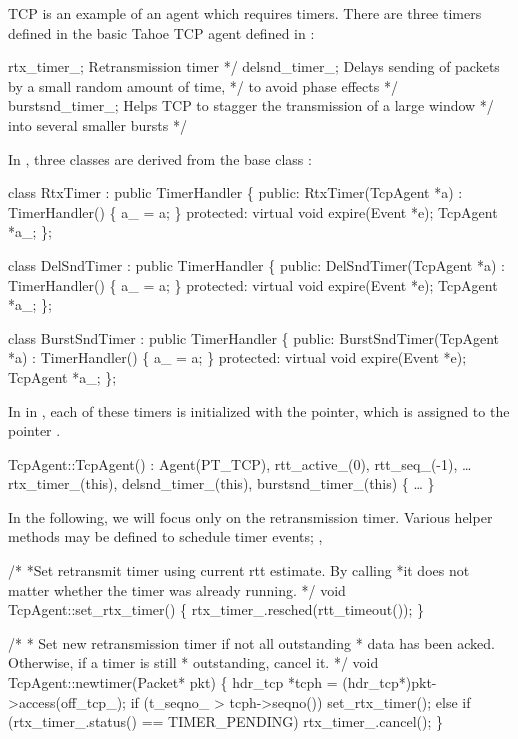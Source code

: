 TCP is an example of an agent which requires timers.  There are three timers
defined in the basic Tahoe TCP agent defined in :
\begin{program}
        rtx_timer_;      \*  Retransmission timer */
        delsnd_timer_;   \*  Delays sending of packets by a small random amount of time, */
			\* to avoid phase effects */
        burstsnd_timer_;   \* Helps TCP to stagger the transmission of a large window */
				\* into several smaller bursts */
\end{program}
In , three classes are derived from the base class
:
\begin{program}
        class RtxTimer : public TimerHandler \{
        public:
            RtxTimer(TcpAgent *a) : TimerHandler() \{ a_ = a; \}
        protected:                   
            virtual void expire(Event *e);
            TcpAgent *a_;
        \};  
            
        class DelSndTimer : public TimerHandler \{
        public:
            DelSndTimer(TcpAgent *a) : TimerHandler() \{ a_ = a; \}
        protected:
            virtual void expire(Event *e);
            TcpAgent *a_;
        \};      
    
        class BurstSndTimer : public TimerHandler \{
        public: 
            BurstSndTimer(TcpAgent *a) : TimerHandler() \{ a_ = a; \}
        protected:
            virtual void expire(Event *e); 
            TcpAgent *a_;
        \};  
\end{program}
In
in ,
each of these timers
is initialized with the  pointer,
which is assigned to the pointer .
\begin{program}
        TcpAgent::TcpAgent() : Agent(PT_TCP), rtt_active_(0), rtt_seq_(-1), 
            \ldots
            rtx_timer_(this), delsnd_timer_(this), burstsnd_timer_(this)
        \{
            \ldots
        \}
\end{program}
In the following, we will focus only on the retransmission timer.  Various
helper methods may be defined to schedule timer events; \eg,
\begin{program}
        /*
         *{\cf Set retransmit timer using current rtt estimate.  By calling }
         *{\cf it does not matter whether the timer was already running.}
         */
        void TcpAgent::set_rtx_timer()
        \{
            rtx_timer_.resched(rtt_timeout());
        \}

        /*
         * {\cf Set new retransmission timer if not all outstanding}
         * {\cf data has been acked.  Otherwise, if a timer is still}
         * {\cf outstanding, cancel it.}
         */
        void TcpAgent::newtimer(Packet* pkt)
        \{
            hdr_tcp *tcph = (hdr_tcp*)pkt->access(off_tcp_);
            if (t_seqno_ > tcph->seqno())
                set_rtx_timer();
            else if (rtx_timer_.status() == TIMER_PENDING)
                rtx_timer_.cancel();
        \}
\end{program}
